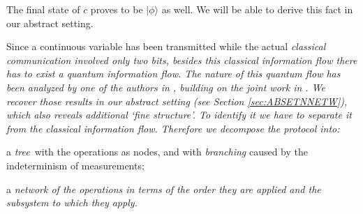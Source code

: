 \documentclass[10pt]{article}
\begin{document}
\vspace{1.2mm}

\vspace{-1.5mm}\noindent
The final state of $c$ proves to be $|\phi\rangle$ as well.  We will be able to
derive this fact in our abstract setting.

Since a continuous variable has been transmitted while the actual \em
classical communication \em involved only two bits, besides this \em classical
information flow \em there has to exist a \em quantum information flow\em.  The
nature of this quantum flow has been analyzed by one of the authors in
\cite{Coe1,Coe2}, building on the joint work in \cite{AC}. We recover those results
in our abstract setting (see Section 
\ref{sec:ABSETNNETW}), which also reveals additional
`fine structure'. To identify it we have to separate it from
the classical information flow. Therefore we decompose the
protocol into:
\ben
\item a {\it tree\,} with the  operations as nodes, and
  with \emph{branching} caused by the indeterminism of
measurements;
\item  a \em network \em of the operations in terms of 
the order they are applied and the subsystem
to which they apply. 
\een 
\end{document}
